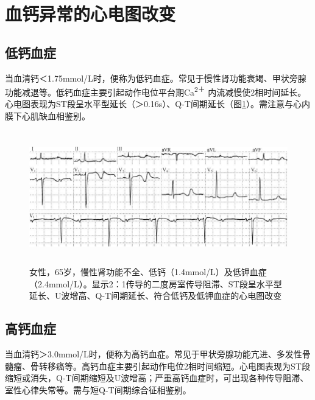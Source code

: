 \section{血钙异常的心电图改变}

\protect\hypertarget{text00053.htmlux5cux23subid640}{}{}

\subsection{低钙血症}

当血清钙＜1.75mmol/L时，便称为低钙血症。常见于慢性肾功能衰竭、甲状旁腺功能减退等。低钙血症主要引起动作电位平台期Ca\textsuperscript{2＋}
内流减慢使2相时间延长。心电图表现为ST段呈水平型延长（＞0.16s）、Q-T间期延长（图\ref{fig45-6}）。需注意与心内膜下心肌缺血相鉴别。

\begin{figure}[!htbp]
 \centering
 \includegraphics[width=5.8125in,height=2.27083in]{./images/Image00734.jpg}
 \captionsetup{justification=centering}
 \caption{女性，65岁，慢性肾功能不全、低钙（1.4mmol/L）及低钾血症（2.4mmol/L）。显示2：1传导的二度房室传导阻滞、ST段呈水平型延长、U波增高、Q-T间期延长、符合低钙及低钾血症的心电图改变}
 \label{fig45-6}
  \end{figure} 

\protect\hypertarget{text00053.htmlux5cux23subid641}{}{}

\subsection{高钙血症}

当血清钙＞3.0mmol/L时，便称为高钙血症。常见于甲状旁腺功能亢进、多发性骨髓瘤、骨转移癌等。高钙血症主要引起动作电位2相时间缩短。心电图表现为ST段缩短或消失，Q-T间期缩短及U波增高；严重高钙血症时，可出现各种传导阻滞、室性心律失常等。需与短Q-T间期综合征相鉴别。

\protect\hypertarget{text00053.htmlux5cux23subid642}{}{}

